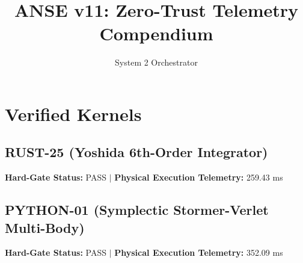 \documentclass[11pt,a4paper]{article}
\title{\textbf{ANSE v11: Zero-Trust Telemetry Compendium}}
\author{System 2 Orchestrator}
\begin{document}
\maketitle
\section{Verified Kernels}
\subsection{RUST-25 (Yoshida 6th-Order Integrator)}
\textbf{Hard-Gate Status:} PASS $|$ \textbf{Physical Execution Telemetry:} 259.43 ms\\


\subsection{PYTHON-01 (Symplectic Stormer-Verlet Multi-Body)}
\textbf{Hard-Gate Status:} PASS $|$ \textbf{Physical Execution Telemetry:} 352.09 ms\\

\end{document}

